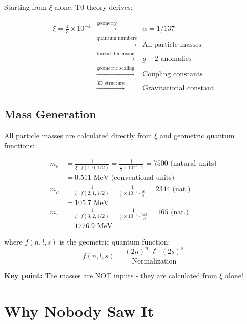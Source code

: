\documentclass[12pt,a4paper]{article}
\theoremstyle{definition}
\begin{document}
	Starting from $\xi$ alone, T0 theory derives:
	
	\begin{equation}
		\begin{array}{rcl}
			\xi = \frac{4}{3} \times 10^{-4} & \xrightarrow{\text{geometry}} & \alpha = 1/137\\
			& \xrightarrow{\text{quantum numbers}} & \text{All particle masses}\\
			& \xrightarrow{\text{fractal dimension}} & g-2 \text{ anomalies}\\
			& \xrightarrow{\text{geometric scaling}} & \text{Coupling constants}\\
			& \xrightarrow{\text{3D structure}} & \text{Gravitational constant}
		\end{array}
	\end{equation}
	
	\subsection{Mass Generation}
	
	All particle masses are calculated directly from $\xi$ and geometric quantum functions:
	
	\begin{align}
		m_e &= \frac{1}{\xi \cdot f(1,0,1/2)} = \frac{1}{\frac{4}{3} \times 10^{-4} \cdot 1} = 7500 \text{ (natural units)}\\
		&= 0.511 \text{ MeV (conventional units)}\\
		m_\mu &= \frac{1}{\xi \cdot f(2,1,1/2)} = \frac{1}{\frac{4}{3} \times 10^{-4} \cdot \frac{16}{5}} = 2344 \text{ (nat.)}\\
		&= 105.7 \text{ MeV}\\
		m_\tau &= \frac{1}{\xi \cdot f(3,2,1/2)} = \frac{1}{\frac{4}{3} \times 10^{-4} \cdot \frac{729}{16}} = 165 \text{ (nat.)}\\
		&= 1776.9 \text{ MeV}
	\end{align}
	
	where $f(n,l,s)$ is the geometric quantum function:
	\begin{equation}
		f(n,l,s) = \frac{(2n)^n \cdot l^l \cdot (2s)^s}{\text{Normalization}}
	\end{equation}
	
	\textbf{Key point:} The masses are NOT inputs - they are calculated from $\xi$ alone!
	
	\section{Why Nobody Saw It}
	
\end{document}
